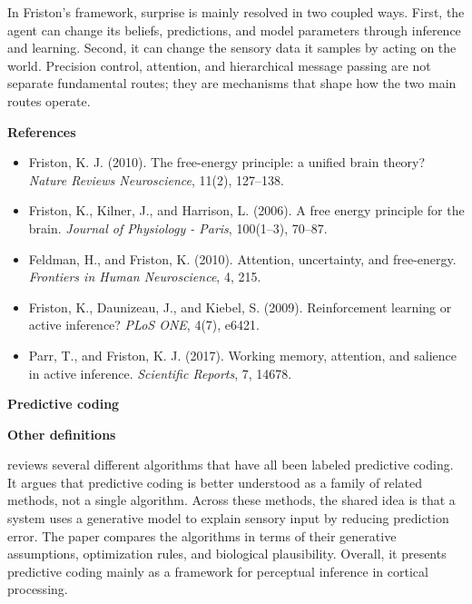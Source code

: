 \documentclass{book}
\providecommand{\ProjectDeepHeading}[2]{%
    \par\medskip\noindent\textbf{#2}\par\smallskip
}
\begin{document}
        In Friston's framework, surprise is mainly resolved in two coupled ways. First, the agent can change its beliefs, predictions, and model parameters through inference and learning. Second, it can change the sensory data it samples by acting on the world. Precision control, attention, and hierarchical message passing are not separate fundamental routes; they are mechanisms that shape how the two main routes operate.
    
    
    \ProjectDeepHeading{11}{References}
        \begin{itemize}[leftmargin=1.8em]
	\item Friston, K. J. (2010). The free-energy principle: a unified brain theory? \textit{Nature Reviews Neuroscience}, 11(2), 127--138.
    \item Friston, K., Kilner, J., and Harrison, L. (2006). A free energy principle for the brain. \textit{Journal of Physiology - Paris}, 100(1--3), 70--87.
    \item Feldman, H., and Friston, K. (2010). Attention, uncertainty, and free-energy. \textit{Frontiers in Human Neuroscience}, 4, 215.
    \item Friston, K., Daunizeau, J., and Kiebel, S. (2009). Reinforcement learning or active inference? \textit{PLoS ONE}, 4(7), e6421.
    \item Parr, T., and Friston, K. J. (2017). Working memory, attention, and salience in active inference. \textit{Scientific Reports}, 7, 14678.
        \end{itemize}

\ProjectDeepHeading{6}{Predictive coding}


\ProjectDeepHeading{9}{Other definitions}
        \cite{spratling-2017-a-review-of-predictive-coding-algorithms} reviews several different algorithms that have all been labeled predictive coding. It argues that predictive coding is better understood as a family of related methods, not a single algorithm. Across these methods, the shared idea is that a system uses a generative model to explain sensory input by reducing prediction error. The paper compares the algorithms in terms of their generative assumptions, optimization rules, and biological plausibility.
        Overall, it presents predictive coding mainly as a framework for perceptual inference in cortical processing.
        
\end{document}

